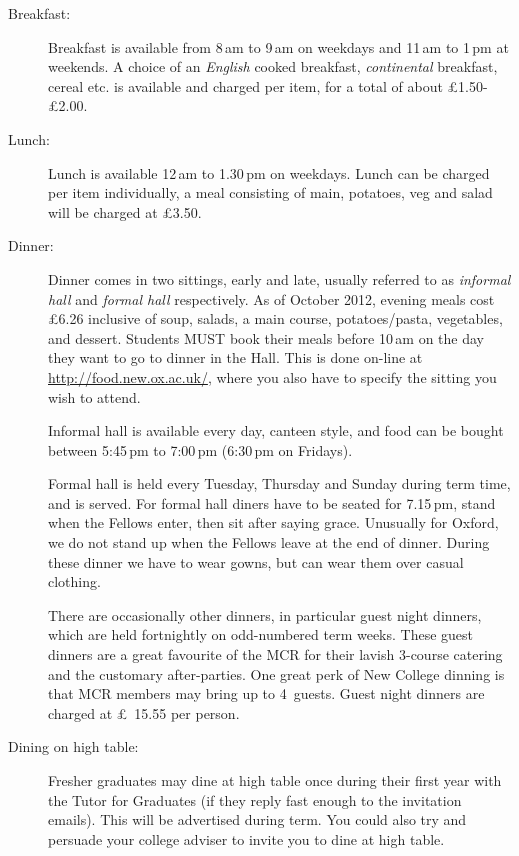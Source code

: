 \documentclass[a4paper,fleqn,12pt]{book} %
\begin{document}
\begin{description}
\item[Breakfast:] Breakfast is available from 8\,am to 9\,am on weekdays
and 11\,am to 1\,pm at weekends. A choice of an \emph{English} cooked breakfast,
\emph{continental} breakfast, cereal etc. is available and charged per item, for
a total of about \pounds1.50-\pounds2.00.
\item[Lunch:] Lunch is available 12\,am to 1.30\,pm on weekdays. Lunch can be
charged per item individually, a meal consisting of main, potatoes, veg and
salad will be charged at \pounds3.50.
\item[Dinner:] 
Dinner comes in two sittings, early and late, usually referred to as \emph{informal
hall} and  \emph{formal hall} respectively. As of
October 2012, evening meals cost \pounds6.26 inclusive of soup, salads, a main
course, potatoes/pasta, vegetables, and dessert. Students MUST book their meals before
10\,am on the day they want to go to dinner in the Hall. This is done on-line at
\url{http://food.new.ox.ac.uk/}, where you also have to specify the sitting you
wish to attend.

Informal hall is available every day, canteen style, and food can be bought
between 5:45\,pm to 7:00\,pm (6:30\,pm on Fridays). 

Formal hall is held every Tuesday, Thursday and
Sunday during term time, and is served. For formal hall diners
have to be seated for 7.15\,pm, stand when the Fellows enter, then sit after
saying grace. Unusually for Oxford, we do not stand up when the Fellows leave
at the end of dinner. During these dinner we have to wear gowns, but can wear
them over casual clothing.

There are occasionally other dinners, in particular guest night dinners, which
are held fortnightly on odd-numbered term weeks. These guest dinners are a great
favourite of the MCR for their lavish 3-course catering and the customary
after-parties. One great perk of New College dinning is that MCR members may
bring up to 4~guests. Guest night dinners are charged at \pounds~15.55 per
person.

\item[Dining on high table:] Fresher graduates may dine at high table once
during their first year with the Tutor for Graduates (if they reply fast enough
to the invitation emails).
This will be advertised during term. You could also try and persuade your college adviser to invite you to dine at high table.
\end{description}
\end{document}
